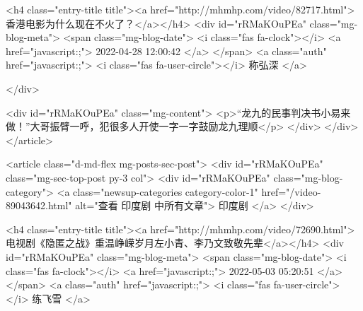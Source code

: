                                             <h4 class="entry-title title"><a href="http://mhmhp.com/video/82717.html">香港电影为什么现在不火了？</a></h4>
                                            <div id="rRMaKOuPEa"  class="mg-blog-meta">
                                                <span class="mg-blog-date">
                                                    <i class="fas fa-clock"></i>
                                                    <a href="javascript:;">
                                                        2022-04-28 12:00:42
                                                    </a>
                                                </span>
                                                <a class="auth" href="javascript:;">
                                                    <i class="fas fa-user-circle"></i>
                                                    称弘深
                                                </a>

                                            </div>


                                            <div id="rRMaKOuPEa"  class="mg-content">
                                                <p>“龙九的民事判决书小易来做！”大哥振臂一呼，犯很多人开使一字一字鼓励龙九理顺</p>
                                            </div>
                                        </div>
                                    </article>
                                    
                                    <article class="d-md-flex mg-posts-sec-post">
                                        <div id="rRMaKOuPEa"  class="mg-sec-top-post py-3 col">
                                            <div id="rRMaKOuPEa"  class="mg-blog-category">
                                                <a class="newsup-categories category-color-1" href="/video-89043642.html" alt="查看 印度剧 中所有文章">
                                                    印度剧
                                                </a>
                                            </div>

                                            <h4 class="entry-title title"><a href="http://mhmhp.com/video/72690.html">电视剧《隐匿之战》重温峥嵘岁月左小青、李乃文致敬先辈</a></h4>
                                            <div id="rRMaKOuPEa"  class="mg-blog-meta">
                                                <span class="mg-blog-date">
                                                    <i class="fas fa-clock"></i>
                                                    <a href="javascript:;">
                                                        2022-05-03 05:20:51
                                                    </a>
                                                </span>
                                                <a class="auth" href="javascript:;">
                                                    <i class="fas fa-user-circle"></i>
                                                    练飞雪
                                                </a>

